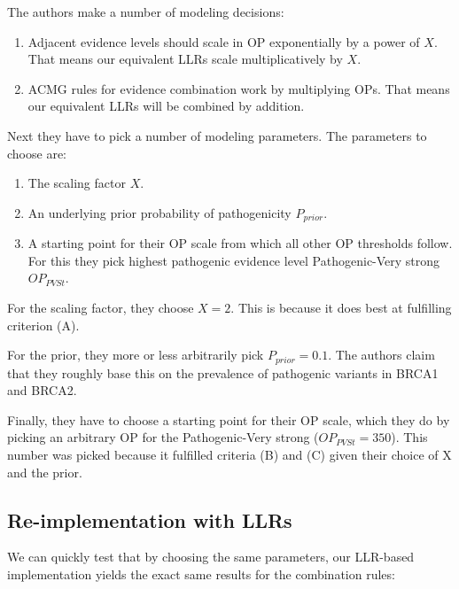 \documentclass[12pt]{article}
\begin{document}
The authors make a number of modeling decisions:
\begin{enumerate}
  \item Adjacent evidence levels should scale in OP exponentially by a power
  of $X$. That means our equivalent LLRs scale multiplicatively by $X$.
  \item ACMG rules for evidence combination work by multiplying OPs. That means
  our equivalent LLRs will be combined by addition.
\end{enumerate}

Next they have to pick a number of modeling parameters. The parameters to choose are:
\begin{enumerate}
  \item The scaling factor $X$.
  \item An underlying prior probability of pathogenicity $P_{prior}$.
  \item A starting point for their OP scale from which all other OP thresholds
  follow. For this they pick highest pathogenic evidence level Pathogenic-Very
  strong $OP_{PVSt}$.
\end{enumerate}

For the scaling factor, they choose $X=2$. This is because it does best at fulfilling criterion (A).

For the prior, they more or less arbitrarily pick $P_{prior}=0.1$. The authors
claim that they roughly base this on the prevalence of pathogenic variants in BRCA1
and BRCA2.

Finally, they have to choose a starting point for their OP scale, which they do by picking an arbitrary OP for the Pathogenic-Very strong ($OP_{PVSt}=350$). This number was picked because it fulfilled criteria (B) and (C) given their choice of X and
the prior.

\subsection*{Re-implementation with LLRs}

We can quickly test that by choosing the same parameters, our LLR-based
implementation yields the exact same results for the combination rules:
\end{document}
